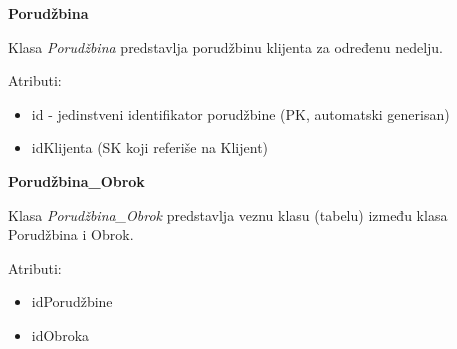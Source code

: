 \textbf{\large Porudžbina}
\vspace{0.3cm}

Klasa \textit{Porudžbina} predstavlja porudžbinu klijenta za određenu nedelju.

Atributi:
\begin{itemize}
    \item id - jedinstveni identifikator porudžbine (PK, automatski generisan)
    \item idKlijenta (SK koji referiše na Klijent)
\end{itemize}

\textbf{\large Porudžbina\_Obrok}
\vspace{0.3cm}

Klasa \textit{Porudžbina\_Obrok} predstavlja veznu klasu (tabelu) između klasa Porudžbina i Obrok.

Atributi:
\begin{itemize}
    \item idPorudžbine
    \item idObroka
\end{itemize}